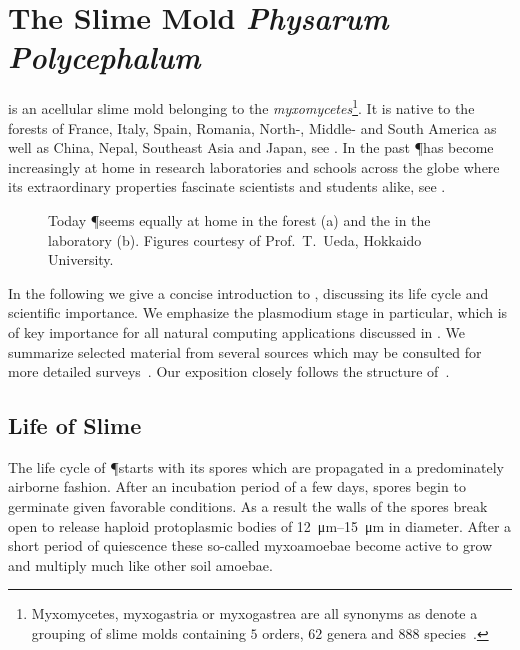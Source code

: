 \section{The Slime Mold \textit{Physarum Polycephalum}}

	\Pp is an acellular slime mold belonging to the \emph{myxomycetes}\footnote{Myxomycetes, myxogastria or myxogastrea are all synonyms as denote a grouping of slime molds containing $5$ orders, $62$ genera and $888$ species~\cite{ainsworth2008ainsworth}.}. It is native to the forests of France, Italy, Spain, Romania, North-, Middle- and South America as well as China, Nepal, Southeast Asia and Japan, see . In the past \P has become increasingly at home in research laboratories and schools across the globe where its extraordinary properties fascinate scientists and students alike, see .

	\begin{figure}[!htp]
		\centering
		\qquad
		\caption[\P exploring various environments]{Today \P seems equally at home in the forest (a) and the in the laboratory (b). Figures courtesy of Prof.~T.~Ueda, Hokkaido University.}
		\label{fig:exploration}
	\end{figure}

	In the following we give a concise introduction to \Pp, discussing its life cycle and scientific importance. We emphasize the plasmodium stage in particular, which is of key importance for all natural computing applications discussed in . We summarize selected material from several sources which may be consulted for more detailed surveys~\cite{stephenson1994myxomycetes,nowotny2000myxomyceten,grube2016physarum,Sauer1986,Mayne2016,howard1931life}. Our exposition closely follows the structure of~\cite{nowotny2000myxomyceten}.
	
	\FloatBarrier
	
	\subsection{Life of Slime}


		The life cycle of \P starts with its spores which are propagated in a predominately airborne fashion. After an incubation period of a few days, spores begin to germinate given favorable conditions. As a result the walls of the spores break open to release haploid protoplasmic bodies of \SIrange{12}{15}{\micro\metre} in diameter. After a short period of quiescence these so-called myxoamoebae become active to grow and multiply much like other soil amoebae. 

